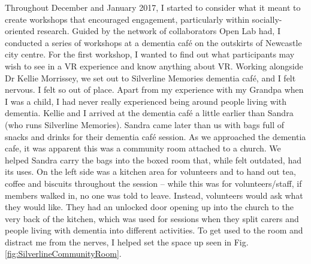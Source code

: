 Throughout December and January 2017, I started to consider what it meant to create workshops that encouraged engagement, particularly within socially-oriented research. Guided by the network of collaborators Open Lab had, I conducted a series of workshops at a dementia café on the outskirts of Newcastle city centre. For the first workshop, I wanted to find out what participants may wish to see in a VR experience and know anything about VR. Working alongside Dr Kellie Morrissey, we set out to Silverline Memories dementia café, and I felt nervous. I felt so out of place. Apart from my experience with my Grandpa when I was a child, I had never really experienced being around people living with dementia. Kellie and I arrived at the dementia café a little earlier than Sandra (who runs Silverline Memories). Sandra came later than us with bags full of snacks and drinks for their dementia café session. As we approached the dementia cafe, it was apparent this was a community room attached to a church. We helped Sandra carry the bags into the boxed room that, while felt outdated, had its uses. On the left side was a kitchen area for volunteers and to hand out tea, coffee and biscuits throughout the session – while this was for volunteers/staff, if members walked in, no one was told to leave. Instead, volunteers would ask what they would like. They had an unlocked door opening up into the church to the very back of the kitchen, which was used for sessions when they split carers and people living with dementia into different activities. To get used to the room and distract me from the nerves, I helped set the space up seen in Fig.\ref{fig:SilverlineCommunityRoom}.

